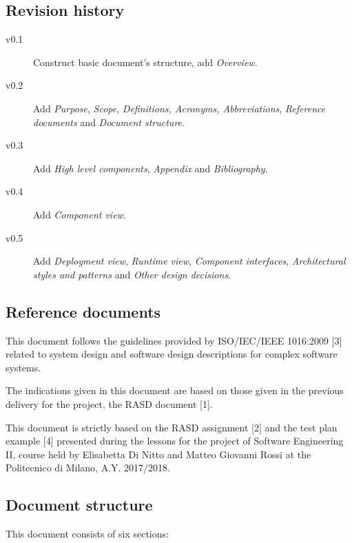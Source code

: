 \documentclass{article}
\begin{document}
	\subsection{Revision history}
	\begin{description}
		\item [v0.1] Construct basic document's structure, add \textit{Overview}.
		\item [v0.2] Add \textit{Purpose}, \textit{Scope}, \textit{Definitions, Acronyms, Abbreviations}, \textit{Reference documents} and \textit{Document structure}.
		\item [v0.3] Add \textit{High level components}, \textit{Appendix} and \textit{Bibliography}.
		\item [v0.4] Add \textit{Component view}.
		\item [v0.5] Add \textit{Deployment view}, \textit{Runtime view}, \textit{Component interfaces}, \textit{Architectural styles and patterns} and \textit{Other design decisions}.
	\end{description}
	
	
	\subsection{Reference documents}
	This document follows the guidelines provided by ISO/IEC/IEEE 1016:2009 [3] related to system design and software design descriptions for complex software systems.

	\bigskip
	The indications given in this document are based on those given in the previous delivery for the project, the RASD document [1].
	
	\bigskip
	This document is strictly based on the RASD assignment [2] and the test plan example [4] presented during the lessons for the project of Software Engineering II, course held by Elisabetta Di Nitto and Matteo Giovanni Rossi at the Politecnico di Milano, A.Y. 2017/2018.
	
	
	\subsection{Document structure}

	This document consists of six sections:
\end{document}
